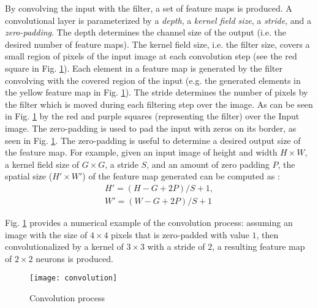 By convolving the input with the filter, a set of feature maps is produced. A convolutional layer is parameterized by a \textit{depth}, a \textit{kernel field size}, a \textit{stride}, and a \textit{zero-padding}. The depth determines the channel size of the output (i.e. the desired number of feature maps). The kernel field size, i.e. the filter size, covers a small region of pixels of the input image at each convolution step (see the red square in Fig. \ref{fig_convol}). Each element in a feature map is generated by the filter convolving with the covered region of the input (e.g. the generated elements in the yellow feature map in Fig. \ref{fig_convol}). The stride determines the number of pixels by the filter which is moved during each filtering step over the image. As can be seen in Fig. \ref{fig_convol} by the red and purple squares (representing the filter) over the Input image. The zero-padding is used to pad the input with zeros on its border, as seen in Fig. \ref{fig_convol}. The zero-padding is useful to determine a desired output size of the feature map. For example, given an input image of height and width  $H\times W$, a kernel field size of $G\times G$, a stride $S$, and an amount of zero padding $P$, the spatial size ($H{'}\times W{'}$) of the feature map generated can be computed as  \cite{bergado2018recurrent}: 
\begin{equation}
\begin{split}
H{'}=(H-G+2P)/S+1,\\
W{'}=(W-G+2P)/S+1
\end{split}
\end{equation}


Fig. \ref{fig_convol} provides a numerical example of the convolution process: assuming an image with the size of $4\times 4$ pixels that is zero-padded with value $1$, then convolutionalized by a kernel of $3\times 3$ with a stride of $2$, a resulting feature map of $2\times 2$ neurons is produced.  
\begin{figure}[!t]
\centering
\texttt{[image: convolution]}
\caption{Convolution process}
\label{fig_convol}
\end{figure}

